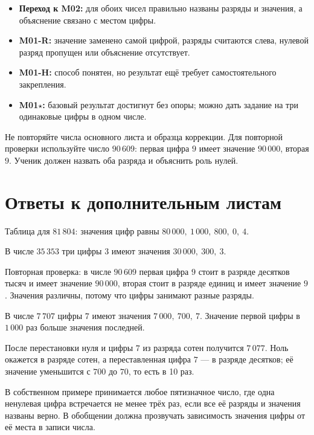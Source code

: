 \begin{resultbox}
  \begin{itemize}
    \item \textbf{Переход к M02:} для обоих чисел правильно названы разряды и
      значения, а объяснение связано с местом цифры.
    \item \textbf{M01-R:} значение заменено самой цифрой, разряды считаются
      слева, нулевой разряд пропущен или объяснение отсутствует.
    \item \textbf{M01-H:} способ понятен, но результат ещё требует
      самостоятельного закрепления.
    \item \textbf{M01\(\star\):} базовый результат достигнут без опоры; можно дать
      задание на три одинаковые цифры в одном числе.
  \end{itemize}
\end{resultbox}

\begin{teacherbox}
  Не повторяйте числа основного листа и образца коррекции. Для повторной
  проверки используйте число \(90\,609\): первая цифра \(9\) имеет значение
  \(90\,000\), вторая \textemdash{} \(9\). Ученик должен назвать оба разряда и объяснить
  роль нулей.
\end{teacherbox}

\newpage
\section{Ответы к дополнительным листам}

\begin{teacherbox}[Ответы M01-R]
  Таблица для \(81\,804\): значения цифр равны
  \(80\,000,\ 1\,000,\ 800,\ 0,\ 4\).

  В числе \(35\,353\) три цифры \(3\) имеют значения
  \(30\,000,\ 300,\ 3\).

  Повторная проверка: в числе \(90\,609\) первая цифра \(9\) стоит в разряде
  десятков тысяч и имеет значение \(90\,000\), вторая стоит в разряде единиц
  и имеет значение \(9\). Значения различны, потому что цифры занимают разные
  разряды.
\end{teacherbox}

\begin{teacherbox}
  В числе \(7\,707\) цифры \(7\) имеют значения \(7\,000,\ 700,\ 7\).
  Значение первой цифры в \(1\,000\) раз больше значения последней.

  После перестановки нуля и цифры \(7\) из разряда сотен получится
  \(7\,077\). Ноль окажется в разряде сотен, а переставленная цифра \(7\) ---
  в разряде десятков; её значение уменьшится с \(700\) до \(70\), то есть в
  10 раз.

  В собственном примере принимается любое пятизначное число, где одна
  ненулевая цифра встречается не менее трёх раз, если все её разряды и
  значения названы верно. В обобщении должна прозвучать зависимость значения
  цифры от её места в записи числа.
\end{teacherbox}
